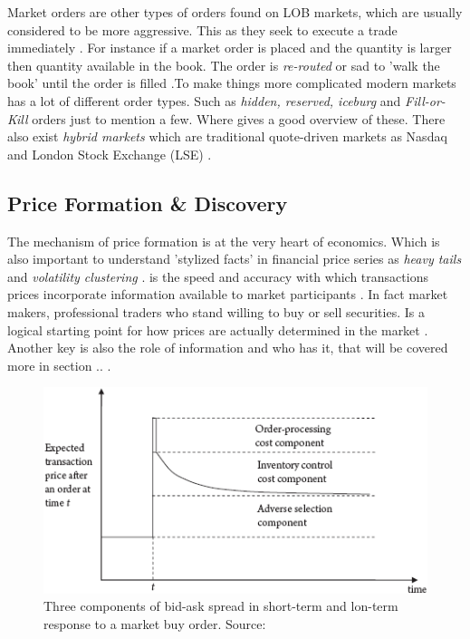 \documentclass{kththesis}
\theoremstyle{definition}
\begin{document}
Market orders are other types of orders found on LOB markets, which are usually considered to be more aggressive. This as they seek to execute a trade immediately \parencite{cartea2015algorithmic}. For instance if a market order is placed and the quantity is larger then quantity available in the book. The order is \textit{re-routed} or sad to 'walk the book' until the order is filled \parencite{hasbrouck2007empirical,cartea2015algorithmic}.To make things more complicated modern markets has a lot of different order types. Such as \textit{hidden, reserved, iceburg} and \textit{Fill-or-Kill} orders just to mention a few. Where \parencite{foucault2013market, cartea2015algorithmic, hasbrouck2007empirical} gives a good overview of these. There also exist \textit{hybrid markets} which are traditional quote-driven markets as Nasdaq and London Stock Exchange (LSE) \parencite{foucault2013market}.

\subsection{Price Formation \& Discovery}
The mechanism of price formation is at the very heart of economics.  Which is also important to understand 'stylized facts' in financial price series as \textit{heavy tails} and \textit{volatility clustering}  \parencite{abergel2012market}.  is the speed and accuracy with which transactions prices incorporate information available to market participants \parencite{foucault2013market}. In fact market makers, professional traders who stand willing to buy or sell securities. Is a logical starting point for how prices are actually determined in the market \parencite{madhavan2000market}. Another key is also the role of information and who has it, that will be covered more in section .. \parencite{cartea2015algorithmic}.

\begin{figure}[H]
    \centering
    \includegraphics[scale=1]{bidask.png}
    \caption{Three components of bid-ask spread in short-term and lon-term response to a market buy order. Source: \textcite{foucault2013market}}
    \label{fig:3}
\end{figure}
\end{document}
